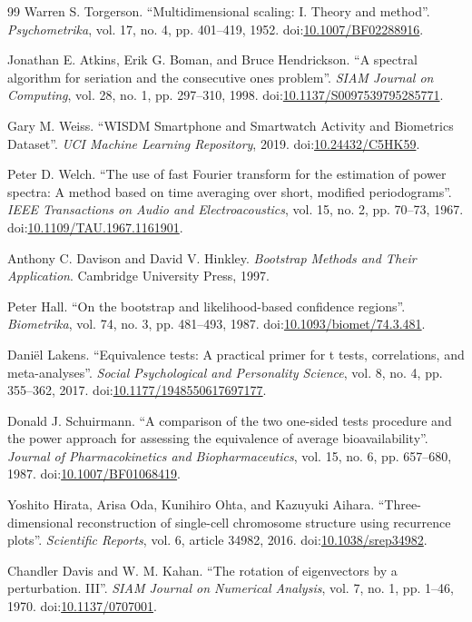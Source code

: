 \documentclass[preprint,review,12pt]{elsarticle}
\begin{document}
{\begin{thebibliography}{99}
Warren S. Torgerson. ``Multidimensional scaling: I. Theory and method''. \textit{Psychometrika}, vol. 17, no. 4, pp. 401--419, 1952. doi:\url{10.1007/BF02288916}.

Jonathan E. Atkins, Erik G. Boman, and Bruce Hendrickson. ``A spectral algorithm for seriation and the consecutive ones problem''. \textit{SIAM Journal on Computing}, vol. 28, no. 1, pp. 297--310, 1998. doi:\url{10.1137/S0097539795285771}.

Gary M. Weiss. ``WISDM Smartphone and Smartwatch Activity and Biometrics Dataset''. \textit{UCI Machine Learning Repository}, 2019. doi:\url{10.24432/C5HK59}.

Peter D. Welch. ``The use of fast Fourier transform for the estimation of power spectra: A method based on time averaging over short, modified periodograms''. \textit{IEEE Transactions on Audio and Electroacoustics}, vol. 15, no. 2, pp. 70--73, 1967. doi:\url{10.1109/TAU.1967.1161901}.

Anthony C. Davison and David V. Hinkley. \textit{Bootstrap Methods and Their Application}. Cambridge University Press, 1997.

Peter Hall. ``On the bootstrap and likelihood-based confidence regions''. \textit{Biometrika}, vol. 74, no. 3, pp. 481--493, 1987. doi:\url{10.1093/biomet/74.3.481}.

Daniël Lakens. ``Equivalence tests: A practical primer for t tests, correlations, and meta-analyses''. \textit{Social Psychological and Personality Science}, vol. 8, no. 4, pp. 355--362, 2017. doi:\url{10.1177/1948550617697177}.

Donald J. Schuirmann. ``A comparison of the two one-sided tests procedure and the power approach for assessing the equivalence of average bioavailability''. \textit{Journal of Pharmacokinetics and Biopharmaceutics}, vol. 15, no. 6, pp. 657--680, 1987. doi:\url{10.1007/BF01068419}.

Yoshito Hirata, Arisa Oda, Kunihiro Ohta, and Kazuyuki Aihara. ``Three-dimensional reconstruction of single-cell chromosome structure using recurrence plots''. \textit{Scientific Reports}, vol. 6, article 34982, 2016. doi:\url{10.1038/srep34982}.

Chandler Davis and W. M. Kahan. ``The rotation of eigenvectors by a perturbation. III''. \textit{SIAM Journal on Numerical Analysis}, vol. 7, no. 1, pp. 1--46, 1970. doi:\url{10.1137/0707001}.


\end{thebibliography}}
\end{document}

